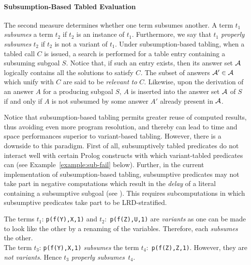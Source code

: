
\paragraph{Subsumption-Based Tabled Evaluation}

The second measure determines whether one term subsumes another.  A term
$t_1$ \emph{subsumes} a term $t_2$ if $t_2$ is an instance of $t_1$.
Furthermore, we say that $t_1$ \emph{properly subsumes} $t_2$ if $t_2$
is not a variant of $t_1$.  Under subsumption-based tabling, when a
tabled call $C$ is issued, a search is performed for a table entry
containing a subsuming subgoal $S$\@.  Notice that, if such an entry
exists, then its answer set ${\cal A}$ logically contains all the solutions
to satisfy $C$\@.  The subset of answers ${\cal A}' \in {\cal A}$ which unify with
$C$ are said to be \emph{relevant to} $C$\@.  Likewise, upon the
derivation of an answer $A$ for a producing subgoal $S$, $A$ is inserted
into the answer set ${\cal A}$ of $S$ if and only if $A$ is not subsumed by
some answer $A'$ already present in ${\cal A}$\@.

Notice that subsumption-based tabling permits greater reuse of computed
results, thus avoiding even more program resolution, and thereby can
lead to time and space performances superior to variant-based tabling.
However, there is a downside to this paradigm.  First of all,
subsumptively tabled predicates do not interact well with certain Prolog
constructs with which variant-tabled predicates can (see
Example~\ref{example:sub-fail} below).  Further, in the current
implementation of subsumption-based tabling, subsumptive predicates may
not take part in negative computations which result in the \emph{delay}
 of a literal
containing a subsumptive subgoal (see ).
This requires subcomputations in which subsumptive predicates
take part to be LRD-stratified.

\begin{example}
The terms $t_1$: {\tt p(f(Y),X,1)} and $t_2$:~{\tt p(f(Z),U,1)} are
\emph{variants} as one can be made to look like the other by a
renaming of the variables.  Therefore, each \emph{subsumes} the other. \\
\noindent The term $t_3$: {\tt p(f(Y),X,1)} \emph{subsumes} the term
$t_4$:~{\tt p(f(Z),Z,1)}.  However, they are \emph{not variants}.  Hence
$t_3$ \emph{properly subsumes}~$t_4$.\fillBox
\end{example}

